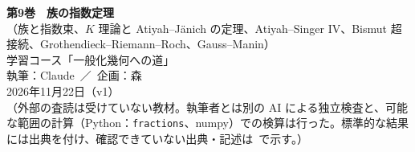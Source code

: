 
\usepackage{tikz}
\usepackage{tikz-cd}
\usetikzlibrary{arrows.meta,positioning,calc}
\newcommand{\Oc}{\mathcal O}
\newcommand{\CP}{\mathbb{CP}}
\newcommand{\Ker}{\operatorname{Ker}}
\newcommand{\Coker}{\operatorname{Coker}}
\newcommand{\Ran}{\operatorname{Ran}}
\newcommand{\Ahat}{\widehat{A}}
\newcommand{\Fred}{\mathrm{Fred}}
\newcommand{\Str}{\operatorname{Str}}
\newcommand{\Tr}{\operatorname{Tr}}
\newcommand{\tr}{\operatorname{tr}}
\newcommand{\Jac}{\mathrm{Jac}}
\newcommand{\Sym}{\operatorname{Sym}}
\newcommand{\Gr}{\mathrm{Gr}}
\newcommand{\GL}{\mathrm{GL}}
\newcommand{\Un}{\mathrm{U}}
\newcommand{\Spin}{\mathrm{Spin}}
\newcommand{\Cl}{\mathrm{Cl}}
\newcommand{\ip}[2]{\langle #1,#2\rangle}
\newcommand{\vol}{\mathrm{vol}}
\newcommand{\sgn}{\operatorname{sign}}
\newcommand{\sfl}{\operatorname{SF}}
\newcommand{\ev}{\mathrm{ev}}
\newcommand{\Pc}{\mathcal P}
\newcommand{\TZ}{T_{Z}M}
\renewcommand{\contentsname}{目次}\renewcommand{\figurename}{図}
\usepackage{fontspec}\newfontfamily{}

\sloppy
\begin{center}
{\LARGE\bfseries\sffamily 第9巻　族の指数定理}\\[4pt]
{\large\sffamily （族と指数束、$K$ 理論と Atiyah--J\"anich の定理、Atiyah--Singer IV、Bismut 超接続、Grothendieck--Riemann--Roch、Gauss--Manin）}\\[8pt]
{\large 学習コース「一般化幾何への道」}\\[6pt]
{\large 執筆：Claude\ ／\ 企画：森}\\[3pt]
2026年11月22日（v1）\\[3pt]
{\small （外部の査読は受けていない教材。執筆者とは別の AI による独立検査と、可能な範囲の計算（Python：\texttt{fractions}、numpy）での検算は行った。標準的な結果には出典を付け、確認できていない出典・記述は\tQ\ で示す。）}
\end{center}

